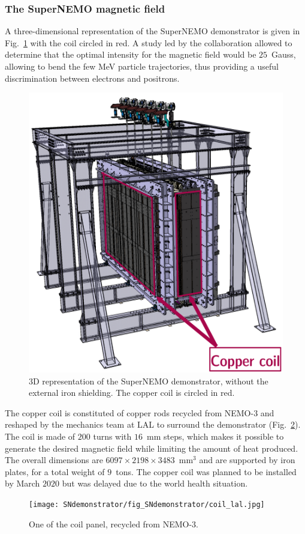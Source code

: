 \subsubsection*{The SuperNEMO magnetic field}

A three-dimensional representation of the SuperNEMO demonstrator is given in Fig.~\ref{fig:coil_3D} with the coil circled in red.
A study led by the collaboration allowed to determine that the optimal intensity for the magnetic field would be $25$~Gauss, allowing to bend the few MeV particle trajectories, thus providing a useful discrimination between electrons and positrons.
\begin{figure}[h!]
\centering
\includegraphics[height=0.8\textwidth]{SNdemonstrator/fig_SNdemonstrator/coil_3D.pdf}
\caption{3D representation of the SuperNEMO demonstrator, without the external iron shielding.
  The copper coil is circled in red.
\label{fig:coil_3D}}
\end{figure}


The copper coil is constituted of copper rods recycled from NEMO-$3$ and reshaped by the mechanics team at LAL to surround the demonstrator (Fig.~\ref{fig:coil_LAL}).
The coil is made of $200$ turns with $16$~mm steps, which makes it possible to generate the desired magnetic field while limiting the amount of heat produced.
The overall dimensions are $6097\times2198\times3483$~mm$^{3}$ and are supported by iron plates, for a total weight of $9$~tons.
The copper coil was planned to be installed by March $2020$ but was delayed due to the world health situation.
\begin{figure}[h!]
\centering
\texttt{[image: SNdemonstrator/fig\_SNdemonstrator/coil\_lal.jpg]}
\caption{One of the coil panel, recycled from NEMO-$3$.
\label{fig:coil_LAL}}
\end{figure}

